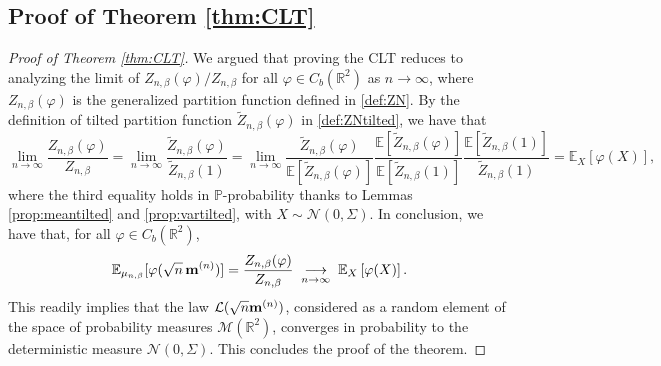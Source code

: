 \documentclass[11pt,oneside]{amsart}
\numberwithin{equation}{section}  %
\theoremstyle{plain}
\theoremstyle{remark}
\def \E {{\mathbb E}}
\def \bm {{\bf m}}
\begin{document}
\subsection{Proof of Theorem \ref{thm:CLT}}
\begin{proof}[Proof of Theorem \ref{thm:CLT}]
We argued that proving the CLT reduces to analyzing the limit of $Z_{n,\beta}(\varphi)/Z_{n,\beta}$ for all $\varphi \in C_b(\mathbb{R}^2)$ as $n \to \infty$, where $Z_{n,\beta}(\varphi)$ is the generalized partition function defined in \eqref{def:ZN}. By the definition of tilted partition function $\widetilde{Z}_{n,\beta}(\varphi)$ in \eqref{def:ZNtilted}, we have that
\begin{equation*}
\lim_{n \to \infty} \frac{Z_{n,\beta}(\varphi)}{Z_{n,\beta}} = \lim_{n \to \infty} \frac{\widetilde{Z}_{n,\beta}(\varphi)}{\widetilde{Z}_{n,\beta}(1)} =\lim_{n \to \infty} \frac{\widetilde{Z}_{n,\beta}(\varphi)}{\E[\widetilde{Z}_{n,\beta}(\varphi)]} \frac{\E[\widetilde{Z}_{n,\beta}(\varphi)]}{\E[\widetilde{Z}_{n,\beta}(1)]} \frac{\E[\widetilde{Z}_{n,\beta}(1)]}{\widetilde{Z}_{n,\beta}(1)}  =  \E_X\left[ \varphi(X) \right],
\end{equation*}
where the third equality holds in $\mathbb{P}$-probability thanks to Lemmas \ref{prop:meantilted} and \ref{prop:vartilted}, with $X \sim \mathcal{N}(0,\Sigma)$.
In conclusion, we have that, for all $\varphi \in C_b(\mathbb{R}^2)$, 
$$
\mathbb{E}_{\mu_{n,\beta}}[\varphi(\sqrt{n}\,\bm^{(n)})] = \frac{Z_{n,\beta}(\varphi)}{Z_{n,\beta}} 
\;\underset{n\to\infty}{\longrightarrow}\; \E_X\left[ \varphi(X) \right].
$$
This readily implies that the law $\mathcal{L}(\sqrt{n} \bm^{(n)})$, considered as a random element of the space of probability measures $\mathcal{M}(\mathbb{R}^2)$, converges in probability to the deterministic measure $\mathcal{N}(0, \Sigma)$. This concludes the proof of the theorem.
\end{proof}



\end{document}

